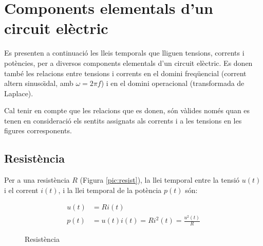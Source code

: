 \section{Components elementals d'un circuit el\`{e}ctric}

Es presenten a continuaci\'{o} les lleis temporals que lliguen tensions, corrents i pot\`{e}ncies, per
a diversos components elementals d'un circuit el\`{e}ctric. Es donen tamb\'{e} les relacions entre
tensions i corrents en el domini freq\"{u}encial (corrent altern sinuso\"{\i}dal, amb $\omega=2\pi f$) i
en el domini operacional (transformada de Laplace).

Cal tenir en compte que les relacions que es donen, s\'{o}n v\`{a}lides
nom\'{e}s quan es tenen en consideraci\'{o} els sentits assignats als
corrents i a les tensions en les figures corresponents.

\subsection{Resist\`{e}ncia} 

Per a una resist\`{e}ncia $R$ (Figura
\vref{pic:resist}), la llei temporal entre la tensi\'{o} $u(t)$ i el
corrent $i(t)$, i la llei temporal de la pot\`{e}ncia $p(t)$ s\'{o}n:
\begin{figure}[h!]
\hfill
\begin{minipage}[b]{5cm}
\caption{Resist\`{e}ncia} \label{pic:resist}
\end{minipage}
\hfill
\begin{minipage}[b][3.25cm][t]{8cm}
   \begin{align}
      u(t) &= R i(t) \\  p(t) &= u(t) i(t) = R i^2(t) = \frac{u^2(t)}{R}
   \end{align}
\end{minipage}
\end{figure}

